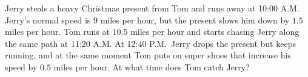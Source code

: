 Jerry steals a heavy Christmas present from Tom and runs away at 10:00 A.M. Jerry's normal speed is $9$ miles per hour, but the present slows him down by $1.5$ miles per hour. Tom runs at $10.5$ miles per hour and starts chasing Jerry along the same path at 11:20 A.M. At 12:40 P.M.\ Jerry drops the present but keeps running, and at the same moment Tom puts on super shoes that increase his speed by $0.5$ miles per hour. At what time does Tom catch Jerry?
